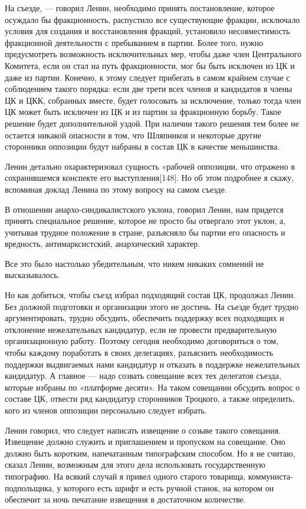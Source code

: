 \documentclass[12pt, a4paper, openany]{book}
\begin{document}
На съезде, — говорил Ленин, необходимо принять постановление, которое осуждало бы фракционность, распустило все существующие фракции, исключало условия для создания и восстановления фракций, установило несовместимость фракционной деятельности с пребыванием в партии. Более того, нужно предусмотреть возможность исключительных мер, чтобы даже член Центрального Комитета, если он стал на путь фракционности, мог бы быть исключен из ЦК и даже из партии. Конечно, к этому следует прибегать в самом крайнем случае с соблюдением такого порядка: если две трети всех членов и кандидатов в члены ЦК и ЦКК, собранных вместе, будет голосовать за исключение, только тогда член ЦК может быть исключен из ЦК и из партии за фракционную борьбу. Такое решение будет дополнительной уздой. При наличии такого решения тем более не остается никакой опасности в том, что Шляпников и некоторые другие сторонники оппозиции будут набраны в состав ЦК в качестве меньшинства.

Ленин детально охарактеризовал сущность «рабочей оппозиции, что отражено в сохранившемся конспекте его выступления[148]. Но об этом подробнее я скажу, вспоминая доклад Ленина по этому вопросу на самом съезде.

В отношении анархо-синдикалистского уклона, говорил Ленин, нам придется принять специальное решение, которое не просто бы отвергало этот уклон, а, учитывая трудное положение в стране, разъясняло бы партии его опасность и вредность, антимарксистский, анархический характер.

Все это было настолько убедительным, что никем никаких сомнений не высказывалось.

Но как добиться, чтобы съезд избрал подходящий состав ЦК, продолжал Ленин. Без должной подготовки и организации этого не достичь. На съезде будет трудно аргументировать, трудно обсудить, обеспечить поддержку всех подходящих и отклонение нежелательных кандидатур, если не провести предварительную организационную работу. Поэтому сегодня необходимо договориться о том, чтобы каждому поработать в своих делегациях, разъяснить необходимость поддержки выдвигаемых нами кандидатур и отказать в поддержке нежелательных кандидатур. А главное — надо созвать совещание всех тех делегатов съезда, которые избраны по «платформе десяти». На таком совещании обсудить вопрос о составе ЦК, отвести ряд кандидатур сторонников Троцкого, а также определить, кого из членов оппозиции персонально следует избрать.

Ленин говорил, что следует написать извещение о созыве такого совещания. Извещение должно служить и приглашением и пропуском на совещание. Оно должно быть коротким, напечатанным типографским способом. Но я не считаю, сказал Ленин, возможным для этого дела использовать государственную типографию. На всякий случай я привел одного старого товарища, коммуниста-подпольщика, у которого есть шрифт и есть ручной станок, на котором он обеспечит за ночь печатание извещения в достаточном количестве.
\end{document}
